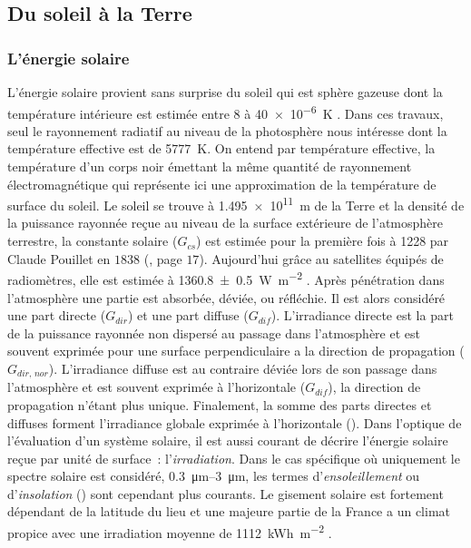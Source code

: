 \subsection{Du soleil à la Terre} %
\label{sub:du_soleil_a_la_terre}
\subsubsection{L’énergie solaire} %
\label{ssub:l_energie_solaire}
L’énergie solaire provient sans surprise du soleil qui est sphère gazeuse dont la
température intérieure est estimée entre \num{8} à \SI{40e-6}{\kelvin}
\parencite{Duffie1980}. Dans ces travaux, seul le rayonnement radiatif au niveau de la
photosphère nous intéresse dont la température effective est de \SI{5777}{\kelvin}. On
entend par température effective, la température d’un corps noir émettant la même quantité
de rayonnement électromagnétique qui représente ici une approximation de la température de
surface du soleil. Le soleil se trouve à \SI{1.495e11}{\metre} de la Terre et la densité
de la puissance rayonnée reçue au niveau de la surface extérieure de l’atmosphère
terrestre, la constante solaire ($G_{cs}$) est estimée pour la première fois à \num{1228}
par Claude Pouillet en $1838$ (\cite{Coulson2012}, page $17$). Aujourd’hui grâce au satellites équipés de radiomètres,
elle est estimée à \SI{1360.8 +- 0.5}{\watt\per\metre\squared} \parencite{Kopp2011}. Après
pénétration dans l’atmosphère une partie est absorbée, déviée, ou réfléchie. Il est alors
considéré une part directe ($G_{dir}$) et une part diffuse ($G_{dif}$). L’irradiance
directe est la part de la puissance rayonnée non dispersé au passage dans l’atmosphère et
est souvent exprimée pour une surface perpendiculaire a la direction de propagation
($G_{dir,\,nor}$). L’irradiance diffuse est au contraire déviée lors de son passage dans
l’atmosphère et est souvent exprimée à l’horizontale ($G_{dif}$), la direction de
propagation n’étant plus unique. Finalement, la somme des parts directes et diffuses
forment l’irradiance globale exprimée à l’horizontale (). Dans l’optique de
l’évaluation d’un système solaire, il est aussi courant de décrire l’énergie solaire reçue
par unité de surface~: l’\textit{irradiation}. Dans le cas spécifique où uniquement le spectre solaire est considéré,
\SIrange{0.3}{3}{\micro\metre}, les termes d’\textit{ensoleillement} ou d’\textit{insolation} () sont
cependant plus courants.
Le gisement solaire est fortement dépendant de la latitude du lieu et une majeure partie
de la France a un climat propice avec une irradiation moyenne de \SI{1112}{kWh\per\metre\squared}
.

